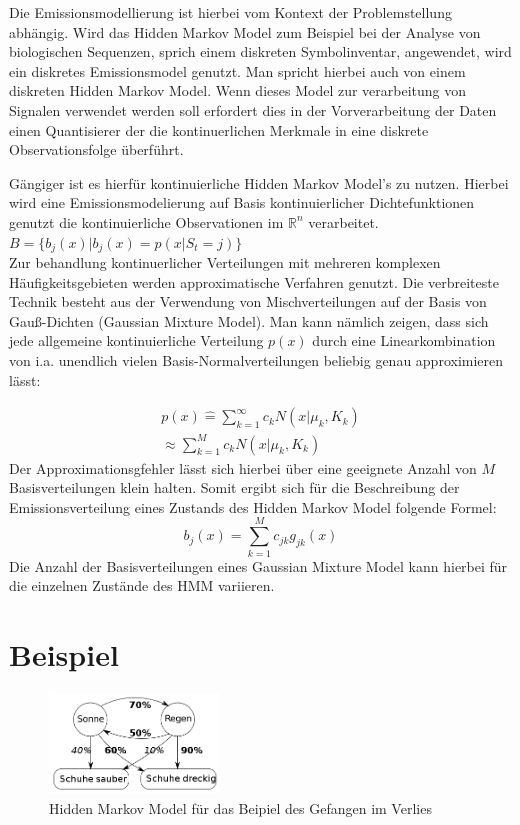 Die Emissionsmodellierung ist hierbei vom Kontext der Problemstellung abhängig. Wird das Hidden Markov Model zum Beispiel bei der Analyse von biologischen Sequenzen, sprich einem diskreten Symbolinventar, angewendet, wird ein diskretes  Emissionsmodel genutzt. Man spricht hierbei auch von einem diskreten Hidden Markov Model. Wenn dieses Model zur verarbeitung von Signalen verwendet werden soll erfordert dies in der Vorverarbeitung der Daten einen Quantisierer der die  kontinuerlichen Merkmale in eine diskrete Observationsfolge überführt. 

Gängiger ist es hierfür kontinuierliche Hidden Markov Model's zu nutzen. Hierbei wird eine Emissionsmodelierung auf Basis kontinuierlicher Dichtefunktionen genutzt die kontinuierliche Observationen im \(\mathbb{R}^n\) verarbeitet.\\ 
\( B =\{ b_{j}(x) | b_{j}(x) = p(x|S_t = j) \} \)\\
Zur behandlung kontinuerlicher Verteilungen mit mehreren komplexen Häufigkeitsgebieten werden approximatische Verfahren genutzt. Die verbreiteste Technik besteht aus der Verwendung von Mischverteilungen auf der Basis von Gauß-Dichten (Gaussian Mixture Model). Man kann nämlich zeigen, dass sich jede allgemeine kontinuierliche Verteilung \(p(x)\) durch eine Linearkombination von i.a. unendlich vielen Basis-Normalverteilungen beliebig genau approximieren lässt\cite[69]{mmmFink}:
 
\begin{multline}
p(x) \hat{=} \sum_{k=1}^\infty c_{k} N(x|\mu_{k},K_{k})\\
\approx \sum_{k=1}^M c_{k} N(x|\mu_{k},K_{k})  
\end{multline}
Der Approximationsgfehler lässt sich hierbei über eine geeignete Anzahl von \(M\) Basisverteilungen klein halten. Somit ergibt sich für die Beschreibung der Emissionsverteilung eines Zustands des Hidden Markov Model folgende Formel:
\begin{equation}
b_{j}(x) = \sum_{k=1}^M c_{jk}g_{jk}(x)
\end{equation}
Die Anzahl der Basisverteilungen eines Gaussian Mixture Model kann hierbei für die einzelnen Zustände des HMM variieren.\\


\section{Beispiel}
\begin{figure}[htbp] \centering
    \includegraphics[width=0.4\textwidth]{Bilder/Kap3/hmm_example.png}
    \caption{Hidden Markov Model für das Beipiel des Gefangen im Verlies}
    \label{fig:hmm_example}
\end{figure}

